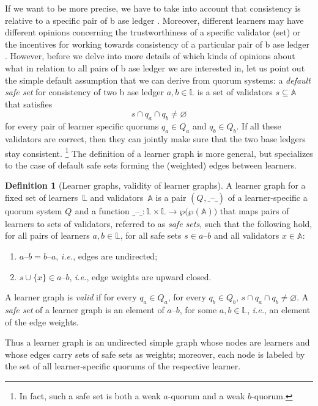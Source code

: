 \documentclass[%
dvipsnames
]{article}
\theoremstyle{definition}
\newtheorem{definition}{Definition}
\newcommand{\base}[1][ ]{%
  b\ase[#1]%
}
\newcommand{\ase}[1][ ]{%
  ase ledger%
  \ifthenelse{\equal{#1}{ }}{}{#1}\xspace%
}
\newcommand{\ie}[1][, ]{\emph{i.e.}#1}
\newcommand{\Q}[1]{%
  Q_{#1}%
}
\newcommand{\q}[2][]{%
  q#1_{#2}%
}
\newcounter{old\v,\r}\setcounter{old\v,\r}{0}%
\begin{document}
If we want to be more precise, %
we have to take into account that %
consistency is relative to a specific pair of \base[s]. %
Moreover, different learners may have different opinions concerning
the trustworthiness of a specific validator (set) or %
the incentives for working towards consistency of a particular pair of \base[s]. %
However, %
before we delve into more details of which kinds of opinions about what in relation to
all pairs of \base[s] we are interested in, %
let us point out the simple default assumption that we can derive from quorum systems: %
a \emph{default safe set} for consistency of two \base[s] \(a,b∈𝕃\) %
is a set of validators \(s\subseteq 𝔸\) that satisfies
\begin{equation}
  \label{eq:validity}
  s \cap \q{a} \cap \q{b} \neq\varnothing
\end{equation}
for every pair of learner specific quorums \(\q{a} \in \Q{a}\) and \(\q{b} \in
\Q{b}\). 
If all these validators are correct, %
then they can jointly make sure that the two base ledgers stay consistent.\xspace%
\footnote{%
  In fact, %
  such a safe set is both a weak \(a\)-quorum and a weak \(b\)-quorum. %
}
The definition of a learner graph is more general,
but specializes to the case of default safe sets forming the (weighted) edges between learners. %

\begin{definition}[Learner graphs, validity of learner graphs]
  \label{def:learner-graph} %
  A learner graph for a fixed set of learners \(𝕃\) and
  validators \(𝔸\) is a pair \((\Q{}, \_–\_)\) 
  of a learner-specific a quorum system \(\Q{}\) and %
  a function \({\_–\_} \colon 𝕃 \times 𝕃 \to \wp\bigl(\wp(𝔸)\bigr)\)
  that maps pairs of learners to sets of validators, %
  referred to as \emph{safe sets}, %
  such that the following %
  hold, for all pairs of learners \(a,b \in 𝕃\),
  for all safe sets \(s \in a–b\) and all validators \(x \in 𝔸\):
  \begin{enumerate}
  \item \(a–b = b–a\), \ie edges are undirected; %
  \item \(s \cup \{x\} \in  a–b\), \ie edge weights are upward closed. %
  \end{enumerate}
  A learner graph is \emph{valid} if %
  for every \(\q{a} \in \Q{a}\), 
  for every \(\q{b} \in \Q{b}\), 
  \(s\cap \q{a} \cap \q{b} \neq \varnothing\). %
  A \emph{safe set} of a learner graph is an element of \(a–b\), for some \(a,b
  \in 𝕃\), %
  \ie an element of the edge weights. 
\end{definition}
Thus a learner graph is an undirected simple graph whose nodes are learners  %
and whose  edges carry sets of safe sets as weights; %
moreover, each node is labeled by %
the set of all learner-specific quorums of the respective learner. %
\end{document}
